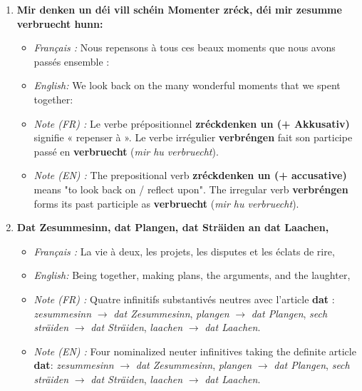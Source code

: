 \begin{enumerate}
    \item \textbf{Mir denken un déi vill schéin Momenter zréck, déi mir zesumme verbruecht hunn:}
    \begin{itemize}
        \item \textit{Français :} Nous repensons à tous ces beaux moments que nous avons passés ensemble :
        \item \textit{English:} We look back on the many wonderful moments that we spent together:
        \item \textit{Note (FR) :} Le verbe prépositionnel \textbf{zréckdenken un (+ Akkusativ)} signifie « repenser à ». Le verbe irrégulier \textbf{verbréngen} fait son participe passé en \textbf{verbruecht} (\textit{mir hu verbruecht}).
        \item \textit{Note (EN) :} The prepositional verb \textbf{zréckdenken un (+ accusative)} means "to look back on / reflect upon". The irregular verb \textbf{verbréngen} forms its past participle as \textbf{verbruecht} (\textit{mir hu verbruecht}).
    \end{itemize}

    \vspace{0.6em}

    \item \textbf{Dat Zesummesinn, dat Plangen, dat Sträiden an dat Laachen,}
    \begin{itemize}
        \item \textit{Français :} La vie à deux, les projets, les disputes et les éclats de rire,
        \item \textit{English:} Being together, making plans, the arguments, and the laughter,
        \item \textit{Note (FR) :} Quatre infinitifs substantivés neutres avec l'article \textbf{dat} : \textit{zesummesinn} $\rightarrow$ \textit{dat Zesummesinn}, \textit{plangen} $\rightarrow$ \textit{dat Plangen}, \textit{sech sträiden} $\rightarrow$ \textit{dat Sträiden}, \textit{laachen} $\rightarrow$ \textit{dat Laachen}.
        \item \textit{Note (EN) :} Four nominalized neuter infinitives taking the definite article \textbf{dat}: \textit{zesummesinn} $\rightarrow$ \textit{dat Zesummesinn}, \textit{plangen} $\rightarrow$ \textit{dat Plangen}, \textit{sech sträiden} $\rightarrow$ \textit{dat Sträiden}, \textit{laachen} $\rightarrow$ \textit{dat Laachen}.
    \end{itemize}

    \vspace{0.6em}


\end{enumerate}
